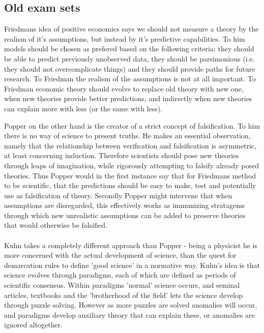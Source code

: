 \documentclass[12pt, a4paper]{article}
\begin{document}
\begin{multicols}{2}
\section{Old exam sets}
Friedmans idea of positive economics says we should not measure a theory by the realism of it's assumptions, but instead by it's predictive capabilities. To him models should be chosen as prefered based on the following criteria: they should be able to predict previously unobserved data, they should be parsimonious (i.e. they should not overcomplicate things) and they should provide paths for future research. 
To Friedman the realism of the assumptions is not at all important. To Friedman economic theory should evolve to replace old theory with new one, when new theories provide better predictions, and indirectly when new theories can explain more with less (or the same with less).

Popper on the other hand is the creator of a strict concept of falsification. To him there is no way of science to present truths. He makes an essential observation, namely that the relationship between verification and falsification is asymmetric, at least concerning induction. Therefore scientists should pose new theories through leaps of imagination, while rigorously attempting to falsify already posed theories. Thus Popper would in the first instance say that for Friedmans method to be scientific, that the predictions should be easy to make, test and potentially use as falsification of theory. Secondly Popper might intervene that when assumptions are disregarded, this effectively works as immunizing stratagems through which new unrealistic assumptions can be added to preserve theories that would otherwise be falsified. 
\\ \\
Kuhn takes a completely different approach than Popper - being a physicist he is more concerned with the actual development of science, than the quest for demarcation rules to define 'good science' in a normative way. Kuhn's idea is that science evolves through paradigms, each of which are defined as periods of scientific consensus. Within paradigms 'normal' science occurs, and seminal articles, textbooks and the 'brotherhood of the field' lets the science develop through puzzle solving. However as more puzzles are solved anomalies will occur, and paradigms develop auxiliary theory that can explain these, or anomalies are ignored altogether. 





\end{multicols}
\end{document}
